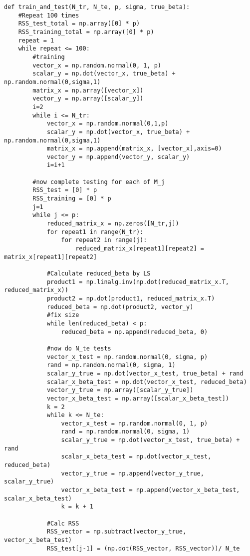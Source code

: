 \documentclass{article}
\begin{document}
\begin{lstlisting}
def train_and_test(N_tr, N_te, p, sigma, true_beta):
    #Repeat 100 times
    RSS_test_total = np.array([0] * p)
    RSS_training_total = np.array([0] * p)
    repeat = 1
    while repeat <= 100:
        #training
        vector_x = np.random.normal(0, 1, p)
        scalar_y = np.dot(vector_x, true_beta) + np.random.normal(0,sigma,1)
        matrix_x = np.array([vector_x])
        vector_y = np.array([scalar_y])
        i=2
        while i <= N_tr:
            vector_x = np.random.normal(0,1,p)
            scalar_y = np.dot(vector_x, true_beta) + np.random.normal(0,sigma,1)
            matrix_x = np.append(matrix_x, [vector_x],axis=0)
            vector_y = np.append(vector_y, scalar_y)
            i=i+1

        #now complete testing for each of M_j
        RSS_test = [0] * p
        RSS_training = [0] * p
        j=1
        while j <= p:
            reduced_matrix_x = np.zeros([N_tr,j])
            for repeat1 in range(N_tr):
                for repeat2 in range(j):
                    reduced_matrix_x[repeat1][repeat2] = matrix_x[repeat1][repeat2]

            #Calculate reduced_beta by LS
            product1 = np.linalg.inv(np.dot(reduced_matrix_x.T, reduced_matrix_x))
            product2 = np.dot(product1, reduced_matrix_x.T)
            reduced_beta = np.dot(product2, vector_y)
            #fix size
            while len(reduced_beta) < p:
                reduced_beta = np.append(reduced_beta, 0)

            #now do N_te tests
            vector_x_test = np.random.normal(0, sigma, p)
            rand = np.random.normal(0, sigma, 1)
            scalar_y_true = np.dot(vector_x_test, true_beta) + rand
            scalar_x_beta_test = np.dot(vector_x_test, reduced_beta)
            vector_y_true = np.array([scalar_y_true])
            vector_x_beta_test = np.array([scalar_x_beta_test])
            k = 2
            while k <= N_te:
                vector_x_test = np.random.normal(0, 1, p)
                rand = np.random.normal(0, sigma, 1)
                scalar_y_true = np.dot(vector_x_test, true_beta) + rand
                scalar_x_beta_test = np.dot(vector_x_test, reduced_beta)
                vector_y_true = np.append(vector_y_true, scalar_y_true)
                vector_x_beta_test = np.append(vector_x_beta_test, scalar_x_beta_test)
                k = k + 1

            #Calc RSS
            RSS_vector = np.subtract(vector_y_true, vector_x_beta_test)
            RSS_test[j-1] = (np.dot(RSS_vector, RSS_vector))/ N_te


\end{lstlisting}
\end{document}
